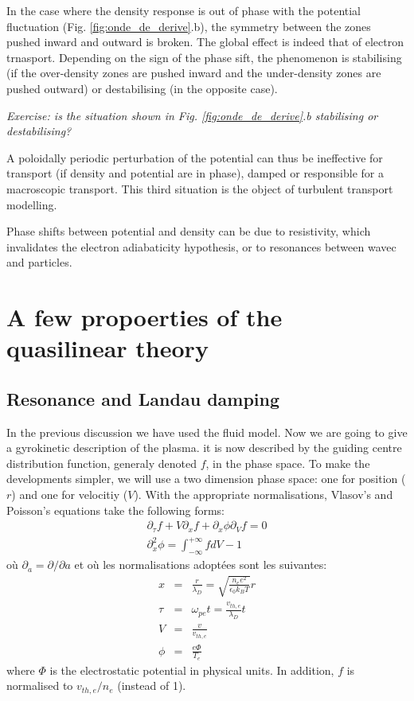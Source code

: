 In the case where the density response is out of phase with the potential fluctuation (Fig. \ref{fig:onde_de_derive}.b), the symmetry between the zones pushed inward and outward is broken. The global effect is indeed that of electron trnasport. Depending on the sign of the phase sift, the phenomenon is stabilising (if the over-density zones are pushed inward and the under-density zones are pushed outward) or destabilising (in the opposite case).

\textit{Exercise: is the situation shown in Fig. \ref{fig:onde_de_derive}.b stabilising or destabilising?}

A poloidally periodic perturbation of the potential can thus be ineffective for transport (if density and potential are in phase), damped or responsible for a macroscopic transport. This third situation is the object of turbulent transport modelling.

Phase shifts between potential and density can be due to resistivity, which invalidates the electron adiabaticity hypothesis, or to resonances between wavec and particles.

		
		\section{A few propoerties of the quasilinear theory}
		\label{sec:QuelquesProprietesDeLaTheorieQuasiLineaire}
		
				\subsection{Resonance and Landau damping}
				\label{sub:ResonanceEtAmortissementDeLandau}
				
				
In the previous discussion we have used the fluid model. Now we are going to give a gyrokinetic description of the plasma. it is now described by the guiding centre distribution function, generaly denoted $f$, in the phase space. To make the developments  simpler, we will use a two dimension phase space: one for position ($r$) and one for velocitiy ($V$). With the appropriate normalisations, Vlasov's and Poisson's equations take the following forms:
\begin{eqnarray*}
		\partial_\tau f + V \partial_x f + \partial_x \phi \partial_V f = 0		\\
		\partial_x^2 \phi = \int_{-\infty}^{+\infty} f dV - 1
\end{eqnarray*}
où $\partial_a = \partial/\partial a$ et où les normalisations adoptées sont les suivantes:
\begin{eqnarray*}
		x     &  =  &  \frac{r}{\lambda_D} = \sqrt{\frac{n_e e^2}{\epsilon_0 k_B T}}r		\\
		\tau  &  =  &  \omega_{pe} t = \frac{v_{th,e}}{\lambda_D} t											\\
		V			&  =  &  \frac{v}{v_{th,e}}			\\
		\phi  &  =  &  \frac{e\Phi}{T_e}
\end{eqnarray*}
where $\Phi$ is the electrostatic potential in physical units. In addition, $f$ is normalised to $v_{th,e}/n_e$ (instead of 1).

